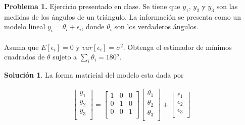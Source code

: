 \documentclass[12pt]{article}
\theoremstyle{plain}
\theoremstyle{definition}
\theoremstyle{definition}
\theoremstyle{definition}
\newtheorem*{solution}{Solución}
\begin{document}
\noindent \textbf{Problema 1.} Ejercicio presentado en clase. Se tiene que $y_1$, $y_2$ y $y_3$ son las medidas de los ángulos de un triángulo. La información se presenta como un modelo lineal $y_i=\theta_i + \epsilon_i $, donde $\theta_i$ son los verdaderos ángulos.\\
\\
Asuma que $E[\epsilon_i]=0$ y $var[\epsilon_i]=\sigma^2$. Obtenga el estimador de mínimos cuadrados de $\theta$ sujeto a $\sum_i \theta_i = 180^{o}$. 
\begin{solution}
La forma matricial del modelo esta dada por

\begin{align*}
 \begin{bmatrix}
     y_1 \\
    y_2 \\
   y_3 \\
\end{bmatrix} = \begin{bmatrix}
     1 & 0 & 0 \\
    0 & 1 & 0 \\
  0 & 0 & 1 \\
\end{bmatrix} \begin{bmatrix}
     \theta_1 \\
    \theta_2 \\
   \theta_3 \\
\end{bmatrix} + \begin{bmatrix}
     \epsilon_1 \\
    \epsilon_2 \\
   \epsilon_3 \\
\end{bmatrix}
\end{align*}


\end{solution}
\end{document}
